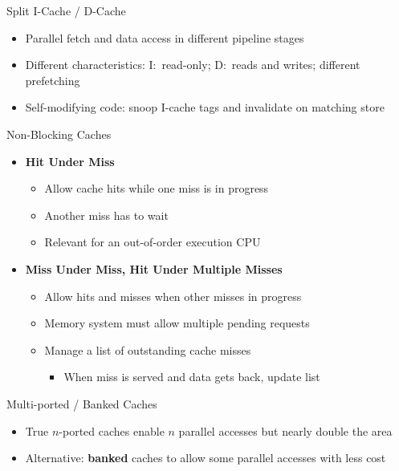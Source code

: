 \documentclass[aspectratio=169,12pt]{beamer}
\begin{document}
\begin{frame}{Split I-Cache / D-Cache}
\begin{itemize}
  \item Parallel fetch and data access in different pipeline stages
  \item Different characteristics: I$:$ read-only; D$:$ reads and writes; different prefetching
  \item Self-modifying code: snoop I-cache tags and invalidate on matching store
\end{itemize}
\end{frame}

\begin{frame}{Non-Blocking Caches}
\begin{itemize}
  \item \textbf{Hit Under Miss}
  \begin{itemize}
    \item Allow cache hits while one miss is in progress
    \item Another miss has to wait
    \item Relevant for an out-of-order execution CPU
  \end{itemize}
  \vspace{0.2cm}
  \item \textbf{Miss Under Miss, Hit Under Multiple Misses}
  \begin{itemize}
    \item Allow hits and misses when other misses in progress
    \item Memory system must allow multiple pending requests
    \item Manage a list of outstanding cache misses
    \begin{itemize}
      \item When miss is served and data gets back, update list
    \end{itemize}
  \end{itemize}
\end{itemize}
\end{frame}

\begin{frame}{Multi-ported / Banked Caches}
\begin{itemize}
  \item True $n$-ported caches enable $n$ parallel accesses but nearly double the area
  \item Alternative: \textbf{banked} caches to allow some parallel accesses with less cost
\end{itemize}
\end{frame}
\end{document}
